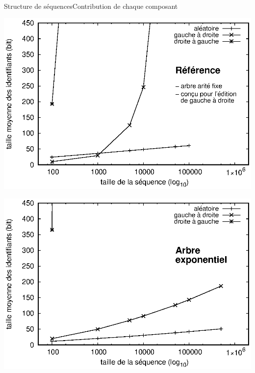 \begin{frame}{Structure de séquences}{Contribution de chaque composant}
  
  \hspace{-1cm}
  \begin{minipage}{0.45\textwidth}
    \includegraphics[width=1.25\textwidth]{img/replication/logoot.eps}
  \end{minipage}
  \hspace{1.5cm}
  \begin{minipage}{0.45\textwidth}
      {\includegraphics[width=1.25\textwidth]{img/replication/double.eps}}%
  \end{minipage}
  

\end{frame}
